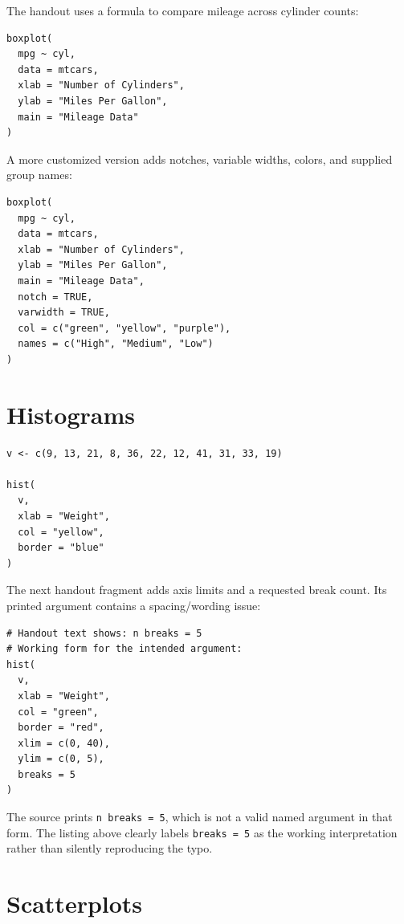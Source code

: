 The handout uses a formula to compare mileage across cylinder counts:

\begin{lstlisting}[style=dsr]
boxplot(
  mpg ~ cyl,
  data = mtcars,
  xlab = "Number of Cylinders",
  ylab = "Miles Per Gallon",
  main = "Mileage Data"
)
\end{lstlisting}

A more customized version adds notches, variable widths, colors, and supplied group names:

\begin{lstlisting}[style=dsr]
boxplot(
  mpg ~ cyl,
  data = mtcars,
  xlab = "Number of Cylinders",
  ylab = "Miles Per Gallon",
  main = "Mileage Data",
  notch = TRUE,
  varwidth = TRUE,
  col = c("green", "yellow", "purple"),
  names = c("High", "Medium", "Low")
)
\end{lstlisting}

\section{Histograms}

\begin{lstlisting}[style=dsr]
v <- c(9, 13, 21, 8, 36, 22, 12, 41, 31, 33, 19)

hist(
  v,
  xlab = "Weight",
  col = "yellow",
  border = "blue"
)
\end{lstlisting}

The next handout fragment adds axis limits and a requested break count. Its printed argument contains a spacing/wording issue:

\begin{lstlisting}[style=dsr]
# Handout text shows: n breaks = 5
# Working form for the intended argument:
hist(
  v,
  xlab = "Weight",
  col = "green",
  border = "red",
  xlim = c(0, 40),
  ylim = c(0, 5),
  breaks = 5
)
\end{lstlisting}

\begin{pitfall}
The source prints \texttt{n breaks = 5}, which is not a valid named argument in that form. The listing above clearly labels \texttt{breaks = 5} as the working interpretation rather than silently reproducing the typo.
\end{pitfall}

\section{Scatterplots}

